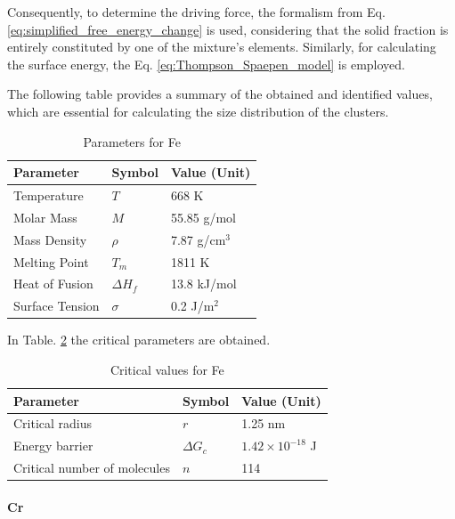 Consequently, to determine the driving force, the formalism from Eq. \ref{eq:simplified_free_energy_change} is used, considering that the solid fraction is 
entirely constituted by one of the mixture's elements. Similarly, for calculating the surface energy, the Eq. \ref{eq:Thompson_Spaepen_model} is employed.

The following table provides a summary of the obtained and identified values, which are essential for calculating the size distribution of the clusters.
\begin{table}[h]
    \centering
    \begin{tabular}{|l|l|l|}
    \hline
    \textbf{Parameter} & \textbf{Symbol} & \textbf{Value (Unit)} \\ \hline
    Temperature        & $T$             & 668 K                 \\ \hline
    Molar Mass         & $M$             & 55.85 g/mol         \\ \hline
    Mass Density       & $\rho$          & 7.87 g/cm$^3$         \\ \hline
    Melting Point      & $T_m$           & 1811 K                \\ \hline
    Heat of Fusion     & $\Delta H_f$    & 13.8 kJ/mol           \\ \hline
    Surface Tension    & $\sigma$        & 0.2 J/m$^2$          \\ \hline
    \end{tabular}
    \caption{Parameters for Fe}
    \label{tab:params_Fe}
\end{table}

In Table. \ref{tab:critical_fe} the critical parameters are obtained.
\begin{table}[h]
	\centering
	\begin{tabular}{|l|l|l|}
	\hline
	\textbf{Parameter} & \textbf{Symbol} & \textbf{Value (Unit)} \\ \hline
	Critical radius        & $r$             & 1.25 nm                 \\ \hline
	Energy barrier         & $\Delta G_c$             & $1.42 \times 10^{-18}$ J         \\ \hline
	Critical number of molecules       & $n$          & 114         \\ \hline
	\end{tabular}
	\caption{Critical values for Fe}
	\label{tab:critical_fe}
\end{table}


\paragraph{Cr}


